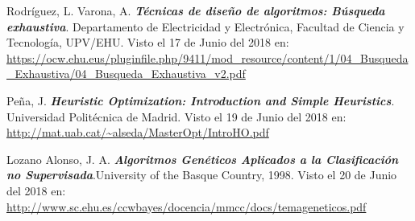 \begin{thebibliography}{IEEE}

 Rodríguez, L. Varona, A. \textbf{\textit{Técnicas de diseño de algoritmos: Búsqueda exhaustiva}}. Departamento de Electricidad y Electrónica,
Facultad de Ciencia y Tecnología, UPV/EHU. Visto el 17 de Junio del 2018 en: \url{https://ocw.ehu.eus/pluginfile.php/9411/mod_resource/content/1/04_Busqueda_Exhaustiva/04_Busqueda_Exhaustiva_v2.pdf}

 Peña, J. \textbf{\textit{Heuristic Optimization: Introduction and Simple Heuristics}}. Universidad Politécnica de Madrid. Visto el 19 de Junio del 2018 en: \url{http://mat.uab.cat/~alseda/MasterOpt/IntroHO.pdf}

 Lozano Alonso, J. A. \textbf{\textit{Algoritmos Genéticos Aplicados a la Clasificación no Supervisada}}.University of the Basque Country, 1998. Visto el 20 de Junio del 2018 en: \url{http://www.sc.ehu.es/ccwbayes/docencia/mmcc/docs/temageneticos.pdf}


\end{thebibliography}
